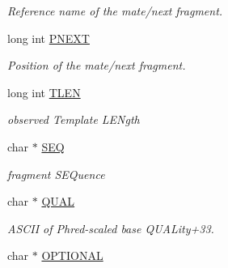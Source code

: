 \begin{DoxyCompactItemize}
\begin{DoxyCompactList}\small\item\em Reference name of the mate/next fragment. \end{DoxyCompactList}\item 
\hypertarget{classGenomicRegionSAM_ad6f88b4324ba508b86102641d819661f}{
long int \hyperlink{classGenomicRegionSAM_ad6f88b4324ba508b86102641d819661f}{PNEXT}}
\label{classGenomicRegionSAM_ad6f88b4324ba508b86102641d819661f}

\begin{DoxyCompactList}\small\item\em Position of the mate/next fragment. \end{DoxyCompactList}\item 
\hypertarget{classGenomicRegionSAM_af180854a186be37eab49520edaa1262f}{
long int \hyperlink{classGenomicRegionSAM_af180854a186be37eab49520edaa1262f}{TLEN}}
\label{classGenomicRegionSAM_af180854a186be37eab49520edaa1262f}

\begin{DoxyCompactList}\small\item\em observed Template LENgth \end{DoxyCompactList}\item 
\hypertarget{classGenomicRegionSAM_a6c2887ed1fa3a25d801641ea1b139032}{
char $\ast$ \hyperlink{classGenomicRegionSAM_a6c2887ed1fa3a25d801641ea1b139032}{SEQ}}
\label{classGenomicRegionSAM_a6c2887ed1fa3a25d801641ea1b139032}

\begin{DoxyCompactList}\small\item\em fragment SEQuence \end{DoxyCompactList}\item 
\hypertarget{classGenomicRegionSAM_ab43ca5f2fbfdee520f1424c3a9fd0706}{
char $\ast$ \hyperlink{classGenomicRegionSAM_ab43ca5f2fbfdee520f1424c3a9fd0706}{QUAL}}
\label{classGenomicRegionSAM_ab43ca5f2fbfdee520f1424c3a9fd0706}

\begin{DoxyCompactList}\small\item\em ASCII of Phred-\/scaled base QUALity+33. \end{DoxyCompactList}\item 
\hypertarget{classGenomicRegionSAM_a1622a8804462bad83b1c49d25eeacb49}{
char $\ast$ \hyperlink{classGenomicRegionSAM_a1622a8804462bad83b1c49d25eeacb49}{OPTIONAL}}
\label{classGenomicRegionSAM_a1622a8804462bad83b1c49d25eeacb49}


\end{DoxyCompactItemize}
